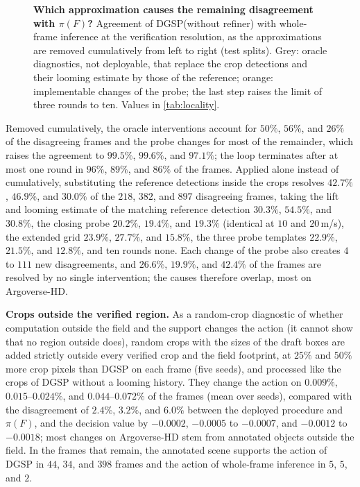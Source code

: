 \documentclass[10pt,letterpaper]{article}
\newcommand{\method}{DGSP\xspace}
\newcommand{\full}{F}
\newcommand{\policy}{\pi}
\theoremstyle{remark}
\theoremstyle{plain}
\theoremstyle{definition}
\begin{document}
\begin{figure}[!htbp]
\caption{\textbf{Which approximation causes the remaining disagreement with $\policy(\full)$?} Agreement of \method (without refiner) with whole-frame inference at the verification resolution, as the approximations are removed cumulatively from left to right (test splits). Grey: oracle diagnostics, not deployable, that replace the crop detections and their looming estimate by those of the reference; orange: implementable changes of the probe; the last step raises the limit of three rounds to ten. Values in \cref{tab:locality}.}
\label{fig:locality}
\end{figure}

Removed cumulatively, the oracle interventions account for $50\%$, $56\%$, and $26\%$ of the disagreeing frames and the probe changes for most of the remainder, which raises the agreement to $99.5\%$, $99.6\%$, and $97.1\%$; the loop terminates after at most one round in $96\%$, $89\%$, and $86\%$ of the frames.
Applied alone instead of cumulatively, substituting the reference detections inside the crops resolves $42.7\%$, $46.9\%$, and $30.0\%$ of the $218$, $382$, and $897$ disagreeing frames, taking the lift and looming estimate of the matching reference detection $30.3\%$, $54.5\%$, and $30.8\%$, the closing probe $20.2\%$, $19.4\%$, and $19.3\%$ (identical at $10$ and $20$\,m/s), the extended grid $23.9\%$, $27.7\%$, and $15.8\%$, the three probe templates $22.9\%$, $21.5\%$, and $12.8\%$, and ten rounds none.
Each change of the probe also creates $4$ to $111$ new disagreements, and $26.6\%$, $19.9\%$, and $42.4\%$ of the frames are resolved by no single intervention; the causes therefore overlap, most on Argoverse-HD.

\noindent\textbf{Crops outside the verified region.}
As a random-crop diagnostic of whether computation outside the field and the support changes the action (it cannot show that no region outside does), random crops with the sizes of the draft boxes are added strictly outside every verified crop and the field footprint, at $25\%$ and $50\%$ more crop pixels than \method on each frame (five seeds), and processed like the crops of \method without a looming history.
They change the action on $0.009\%$, $0.015$--$0.024\%$, and $0.044$--$0.072\%$ of the frames (mean over seeds), compared with the disagreement of $2.4\%$, $3.2\%$, and $6.0\%$ between the deployed procedure and $\policy(\full)$, and the decision value by $-0.0002$, $-0.0005$ to $-0.0007$, and $-0.0012$ to $-0.0018$; most changes on Argoverse-HD stem from annotated objects outside the field.
In the frames that remain, the annotated scene supports the action of \method in $44$, $34$, and $398$ frames and the action of whole-frame inference in $5$, $5$, and $2$.
\end{document}
